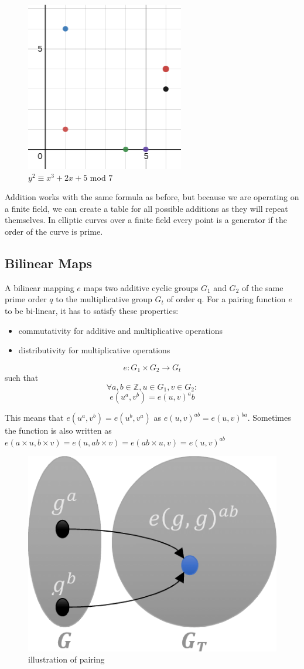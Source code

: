 \documentclass[a4paper,12pt]{scrartcl}
\begin{document}
\begin{figure}[hbt!]
	\centering
	\includegraphics[width=0.5\linewidth]{ec3}
	\caption{$y^2 \equiv x^3 + 2x + 5$ mod $7$}
\end{figure}

Addition works with the same formula as before, but because we are operating on a finite field, we can create a table for all possible additions as they will repeat themselves. In elliptic curves over a finite field every point is a generator if the order of the curve is prime.

\subsection{Bilinear Maps}
A bilinear mapping $e$ maps two additive cyclic groups $G_1$ and $G_2$ of the same prime order $q$ to the multiplicative group $G_t$ of order q. For a pairing function $e$ to be bi-linear, it has to satisfy these properties:
\begin{itemize}
	\item commutativity for additive and multiplicative operations
	\item distributivity for multiplicative operations
\end{itemize}
\[ e: G_1 \times G_2 \rightarrow G_t \]
such that
\[ \forall a,b \in \mathbb{Z}, u \in G_1, v \in G_2: \]
\[ e(u^a,v^b) = e(u,v)^ab \]

This means that $e(u^a,v^b) = e(u^b,v^a)$ as $e(u,v)^{ab} = e(u,v)^{ba}$.
Sometimes the function is also written as $e(a\times{u},b\times{v}) = e(u,ab\times{v}) = e(ab\times{u},v) = e(u,v)^{ab}$

\begin{figure}[hbt!]
	\centering
	\includegraphics[width=0.5\linewidth]{pairing1}
	\caption{illustration of pairing}
\end{figure}
\end{document}
